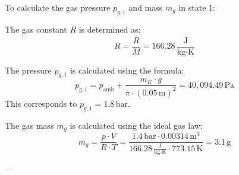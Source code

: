 To calculate the gas pressure \( p_{g,1} \) and mass \( m_g \) in state 1:  

The gas constant \( R \) is determined as:  
\[
R = \frac{\bar{R}}{M} = 166.28 \, \frac{\text{J}}{\text{kg·K}}
\]  

The pressure \( p_{g,1} \) is calculated using the formula:  
\[
p_{g,1} = p_{\text{amb}} + \frac{m_K \cdot g}{\pi \cdot \left(0.05 \, \text{m}\right)^2} = 40,094.49 \, \text{Pa}
\]  
This corresponds to \( p_{g,1} = 1.8 \, \text{bar} \).  

The gas mass \( m_g \) is calculated using the ideal gas law:  
\[
m_g = \frac{p \cdot V}{R \cdot T} = \frac{1.4 \, \text{bar} \cdot 0.00314 \, \text{m}^3}{166.28 \, \frac{\text{J}}{\text{kg·K}} \cdot 773.15 \, \text{K}} = 3.1 \, \text{g}
\]  

---